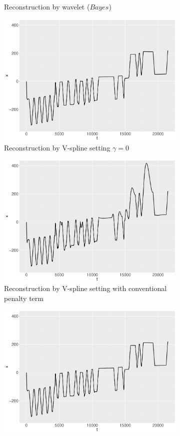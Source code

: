 \begin{figure}
\begin{subfigure}{0.45\textwidth}
    \caption{Reconstruction by wavelet ($\textit{Bayes}$)}\label{ggRealdataXBayes}
    \end{subfigure}
    \begin{subfigure}{0.45\textwidth}
    \centering
    \includegraphics[width=\textwidth,height=0.5\textwidth]{Chapters/02TractorSplineTheory/plot/ggplot/ggRealdataXTractorGamma.pdf}
    \caption{Reconstruction by V-spline setting  $\gamma=0$ }\label{ggRealdataXTractorGamma}
    \end{subfigure}
    \begin{subfigure}{0.45\textwidth}
    \centering
    \includegraphics[width=\textwidth,height=0.5\textwidth]{Chapters/02TractorSplineTheory/plot/ggplot/ggRealdataXTractorAPT.pdf}
    \caption{Reconstruction by V-spline setting with conventional penalty term}\label{ggRealdataXTractorAPT}
    \end{subfigure}
    \begin{subfigure}{0.45\textwidth}
    \centering
    \includegraphics[width=\textwidth,height=0.5\textwidth]{Chapters/02TractorSplineTheory/plot/ggplot/ggRealdataXTractor.pdf}

\end{subfigure}
\end{figure}
